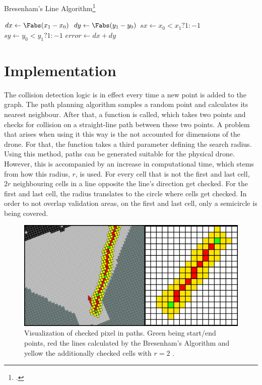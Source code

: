 \begin{algorithm}[]
	\caption{Bresenham's Line Algorithm\footcite{Zingl2012}}
	$dx \gets \Fabs(x_1-x_0)$\;
	$dy \gets \Fabs(y_1-y_0)$\;
	$sx \gets x_0<x_1 ? 1 : -1$\;
	$sy \gets y_0<y_1 ? 1 : -1$\;
	$error \gets dx + dy$\;
\end{algorithm}



\section{Implementation}
The collision detection logic is in effect every time a new point is added to the graph. The path planning algorithm samples a random point and calculates its nearest neighbour. After that, a function is called, which takes two points and checks for collision on a straight-line path between these two points.\newline
A problem that arises when using it this way is the not accounted for dimensions of the drone. For that, the function takes a third parameter defining the search radius. Using this method, paths can be generated suitable for the physical drone. However, this is accompanied by an increase in computational time, which stems from how this radius, $r$, is used. For every cell that is not the first and last cell, $2r$ neighbouring cells in a line opposite the line's direction get checked. For the first and last cell, the radius translates to the circle where cells get checked. In order to not overlap validation areas, on the first and last cell, only a semicircle is being covered. 

\begin{figure}[h]
	\centering
	\includegraphics[width=0.8\linewidth]{img/CheckedPixels}
	\caption{Visualization of checked pixel in paths. Green being start/end points, red the lines calculated by the Bresenham's Algorithm and yellow the additionally checked cells with $r = 2$ .}
	\label{fig:collision_detection_checkedPixels}
\end{figure}

